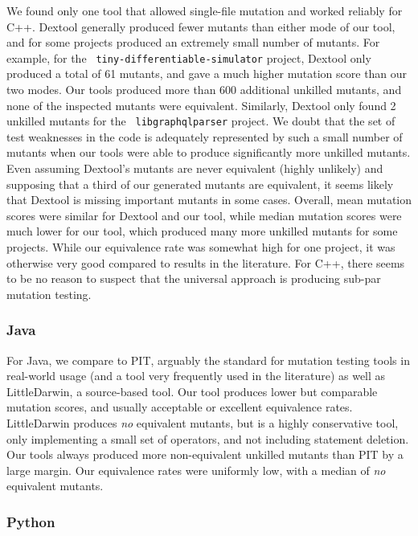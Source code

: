 \documentclass[sigconf,review, anonymous]{acmart}
\begin{document}
{We found only one tool that allowed single-file mutation and worked
reliably for C++.  Dextool generally produced fewer mutants than
either mode of our tool, and for some projects produced an extremely
small number of mutants.  For example, for the {\tt
  tiny-differentiable-simulator} project, Dextool only produced a
total of 61 mutants, and gave a much higher mutation score than our
two modes.  Our tools produced more than 600 additional unkilled
mutants, and none of the inspected mutants were equivalent.
Similarly, Dextool only found 2 unkilled mutants for the {\tt
  libgraphqlparser} project.  We doubt that the set of test weaknesses
in the code is adequately represented by such a small number of
mutants when our tools were able to produce significantly more
unkilled mutants.  Even assuming Dextool's mutants are never
equivalent (highly unlikely) and supposing that a third of our
generated mutants are equivalent, it seems likely that Dextool is
missing important mutants in some cases.  Overall, mean mutation
scores were similar for Dextool and our tool, while
median mutation scores were much lower for our tool, which produced
many more unkilled mutants for some projects.  While our equivalence
rate was somewhat high for one project, it was otherwise very good
compared to results in the literature.  For C++, there seems to
be no reason to suspect that the universal approach is producing
sub-par mutation testing.

\subsubsection{Java}

For Java, we compare to PIT, arguably the standard for mutation
testing tools in real-world usage (and a tool very frequently used in
the literature) as well as LittleDarwin, a source-based tool.  Our
tool produces lower but comparable mutation scores, and usually
acceptable or excellent equivalence rates.  LittleDarwin produces
\emph{no} equivalent mutants, but is a highly conservative tool, only
implementing a small set of operators, and not including statement
deletion.  Our tools always produced more non-equivalent unkilled
mutants than PIT by a large margin.  Our equivalence rates were
uniformly low, with a median of \emph{no} equivalent mutants.

\subsubsection{Python}

}
\end{document}
